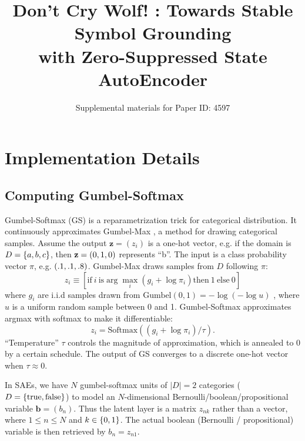 \documentclass[10pt,letterpaper]{article}
\author{Supplemental materials for Paper ID: 4597}
\title{Don't Cry Wolf! : Towards Stable Symbol Grounding\\ with Zero-Suppressed State AutoEncoder}
\begin{document}
\maketitle

\section{Implementation Details}

\subsection{Computing Gumbel-Softmax}
\label{gumbel-softmax-implementation}


Gumbel-Softmax (GS) is a reparametrization trick \cite{jang2016categorical} for categorical distribution.
It continuously approximates Gumbel-Max \cite{maddison2014sampling}, a method for drawing categorical samples.
Assume the output $\mathbf{z}=(z_i)$ is a one-hot vector, e.g. if the domain is $D={\left\{a,b,c\right\}}$, then $\mathbf{z}={\left(0,1,0\right)}$ represents ``b''.
The input is a class probability vector $\pi$, e.g. ${\left(.1,.1,.8\right)}$.
Gumbel-Max draws samples from $D$ following $\pi$:
\[
z_i \equiv [ \text{if}\ i\ \text{is} \arg \max_i (g_i+\log \pi_i) \text{then}\ 1\ \text{else}\ 0 ]
\]
where $g_i$ are i.i.d samples drawn from
 $\text{Gumbel}(0,1) =-\log (-\log u)$ \cite{gumbel1954statistical}, where
$u$ is a uniform random sample between 0 and 1.
Gumbel-Softmax approximates argmax with softmax to make it differentiable:
\[
z_i = \text{Softmax}((g_i+\log \pi_i)/\tau).
\]
``Temperature'' $\tau$ controls the magnitude of approximation, which is annealed to 0 by a certain schedule.
The output of GS converges to a discrete one-hot vector when $\tau\approx 0$.

In SAEs, we have $N$ gumbel-softmax units of $|D|=2$ categories ($D={\left\{\text{true},\text{false}\right\}}$)
to model an $N$-dimensional Bernoulli/boolean/propositional variable $\mathbf{b}=(b_n)$.
Thus the latent layer is a matrix $z_{nk}$ rather than a vector, where $1\leq n \leq N$ and $k\in{\left\{0,1\right\}}$.
The actual boolean (Bernoulli / propositional) variable is then retrieved by $b_n=z_{n1}$.
\end{document}

